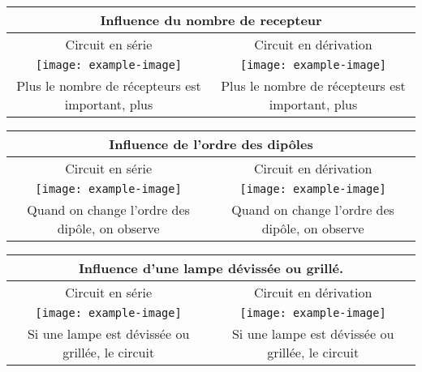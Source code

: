 \documentclass[10pt]{article}
\begin{document}
\renewcommand{\arraystretch}{1.5}
	\centering
	\begin{tabular}{cc} \toprule
		\multicolumn{2}{c}{Influence du nombre de recepteur} \\ \midrule
		Circuit en série & Circuit en dérivation\\ \midrule
		\texttt{[image: example-image]} 
								& \texttt{[image: example-image]} \\
		\parbox[t]{0.47\textwidth}{
		Plus le nombre de récepteurs
					est important, plus
					} 			& \parbox[t]{0.47\textwidth}{
								Plus le nombre de récepteurs
								est important, plus
								 }
													\\ %
	\end{tabular}
	\begin{tabular}{cc} \toprule
		\multicolumn{2}{c}{Influence de l'ordre des dipôles} \\ \midrule
		Circuit en série & Circuit en dérivation\\ \midrule
		\texttt{[image: example-image]} 
								& \texttt{[image: example-image]} \\
		\parbox[t]{0.47\textwidth}{
			Quand on change l'ordre des dipôle,
			on observe
			\answerbox{1}}
								& \parbox[t]{0.47\textwidth}{
									Quand on change l'ordre des dipôle,
									on observe \answerbox{1}
									} \\
	\end{tabular}

	\begin{tabular}{cc} \toprule
		\multicolumn{2}{c}{Influence d'une lampe dévissée ou grillé.} \\ \midrule
		Circuit en série & Circuit en dérivation\\ \midrule
		\texttt{[image: example-image]} 
								& \texttt{[image: example-image]} \\
		\parbox[t]{0.47\textwidth}{
			Si une lampe est dévissée ou grillée, le circuit \vspace{10pt}\answerbox{2}}
								& \parbox[t]{0.47\textwidth}{
									Si une lampe est dévissée ou grillée, le circuit \vspace{10pt}\answerbox{2}
									} \\
	\end{tabular}
\end{document}
